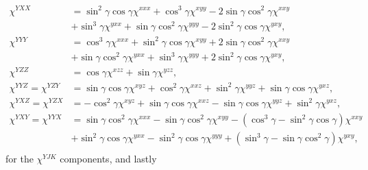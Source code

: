 \documentclass[aps,prb,10pt,letterpaper,notitlepage]{revtex4-1}
\begin{document}
\begin{equation*}
\begin{split}
\chi^{YXX}
&=  \sin^{2}\gamma \cos\gamma \chi^{xxx}
 +  \cos^{3}\gamma          \chi^{xyy}
 - 2\sin\gamma \cos^{2}\gamma \chi^{xxy}\\
&+  \sin^{3}\gamma          \chi^{yxx}
 +  \sin\gamma \cos^{2}\gamma \chi^{yyy}
 - 2\sin^{2}\gamma \cos\gamma \chi^{yxy},\\[10pt]
\chi^{YYY}
&=  \cos^{3}\gamma          \chi^{xxx}
 +  \sin^{2}\gamma \cos\gamma \chi^{xyy}
 + 2\sin\gamma \cos^{2}\gamma \chi^{xxy}\\
&+  \sin\gamma \cos^{2}\gamma \chi^{yxx}
 +  \sin^{3}\gamma          \chi^{yyy}
 + 2\sin^{2}\gamma \cos\gamma \chi^{yxy},\\[10pt]
\chi^{YZZ}
&= \cos\gamma \chi^{xzz} + \sin\gamma \chi^{yzz},\\[10pt]
\chi^{YYZ} = \chi^{YZY}
&= \sin\gamma \cos\gamma \chi^{xyz}
 + \cos^{2}\gamma      \chi^{xxz}
 + \sin^{2}\gamma      \chi^{yyz}
 + \sin\gamma \cos\gamma \chi^{yxz},\\[10pt]
\chi^{YXZ} = \chi^{YZX}
&=
- \cos^{2}\gamma      \chi^{xyz}
+ \sin\gamma \cos\gamma \chi^{xxz}
- \sin\gamma \cos\gamma \chi^{yyz}
+ \sin^{2}\gamma      \chi^{yxz},\\[10pt]
\chi^{YXY} = \chi^{YYX}
&= \sin\gamma \cos^{2}\gamma \chi^{xxx}
 - \sin\gamma \cos^{2}\gamma \chi^{xyy}
 - (\cos^{3}\gamma - \sin^{2}\gamma \cos\gamma) \chi^{xxy}\\
&+ \sin^{2}\gamma \cos\gamma \chi^{yxx}
 - \sin^{2}\gamma \cos\gamma \chi^{yyy}
 + (\sin^{3}\gamma - \sin\gamma \cos^{2}\gamma) \chi^{yxy},\\[10pt]
\end{split}
\end{equation*}
for the $\chi^{YJK}$ components, and lastly
\end{document}
